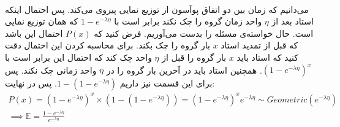 \\
می‌دانیم که زمان بین دو اتفاق پوآسون از توزیع نمایی پیروی می‌کند. پس احتمال اینکه استاد بعد از
$\eta$
واحد زمان گروه را چک نکند برابر است با
$1 - e^{-\lambda \eta}$
که همان
توزیع نمایی است. حال خواسته‌ی مسئله را بدست می‌آوریم. فرض کنید که
$P(x)$
احتمال این باشد که قبل از تمدید استاد
$x$
بار گروه را چک بکند. برای محاسبه کردن این احتمال دقت کنید که استاد باید
$x$
بار گروه را قبل از
$\eta$
واحد چک کند که احتمال این برابر است با
$(1 - e^{-\lambda \eta})^x$.
همچنین استاد باید در آخرین بار گروه را در
$\eta$
واحد زمانی چک نکند. پس برای این قسمت نیز داریم
$1-(1 - e^{-\lambda \eta})$.
پس در نهایت:
\begin{gather*}
    P(x) = (1 - e^{-\lambda \eta})^x \times (1-(1 - e^{-\lambda \eta})) = (1 - e^{-\lambda \eta})^x e^{-\lambda \eta}
    \sim Geometric(e^{-\lambda \eta})\\
    \implies \mathbb{E} = \frac{1-e^{-\lambda \eta}}{e^{-\lambda \eta}}
\end{gather*}